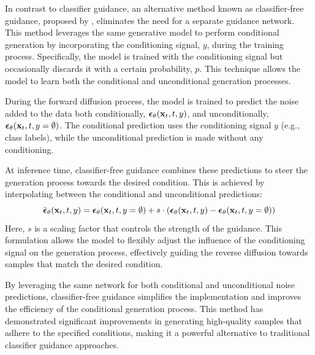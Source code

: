 In contrast to classifier guidance, an alternative method known as classifier-free guidance, proposed by \cite{ho2021classifierfree}, eliminates the need for a separate guidance network. This method leverages the same generative model to perform conditional generation by incorporating the conditioning signal, $y$, during the training process. Specifically, the model is trained with the conditioning signal but occasionally discards it with a certain probability, $p$. This technique allows the model to learn both the conditional and unconditional generation processes.

During the forward diffusion process, the model is trained to predict the noise added to the data both conditionally, $\boldsymbol{\mathbf{\epsilon}}_\theta(\boldsymbol{\mathbf{x}}_t, t, y)$, and unconditionally, $\boldsymbol{\mathbf{\epsilon}}_\theta(\boldsymbol{\mathbf{x}}_t, t, y = \emptyset)$. The conditional prediction uses the conditioning signal $y$ (e.g., class labels), while the unconditional prediction is made without any conditioning.

At inference time, classifier-free guidance combines these predictions to steer the generation process towards the desired condition. This is achieved by interpolating between the conditional and unconditional predictions:
\begin{equation}
\bar{\boldsymbol{\mathbf{\epsilon}}}_\theta(\boldsymbol{\mathbf{x}}_t, t, y) = \boldsymbol{\mathbf{\epsilon}}_\theta(\boldsymbol{\mathbf{x}}_t, t, y = \emptyset) + s \cdot (\boldsymbol{\mathbf{\epsilon}}_\theta(\boldsymbol{\mathbf{x}}_t, t, y) - \boldsymbol{\mathbf{\epsilon}}_\theta(\boldsymbol{\mathbf{x}}_t, t, y = \emptyset))
\end{equation}
Here, $s$ is a scaling factor that controls the strength of the guidance. This formulation allows the model to flexibly adjust the influence of the conditioning signal on the generation process, effectively guiding the reverse diffusion towards samples that match the desired condition.

By leveraging the same network for both conditional and unconditional noise predictions, classifier-free guidance simplifies the implementation and improves the efficiency of the conditional generation process. This method has demonstrated significant improvements in generating high-quality samples that adhere to the specified conditions, making it a powerful alternative to traditional classifier guidance approaches.


